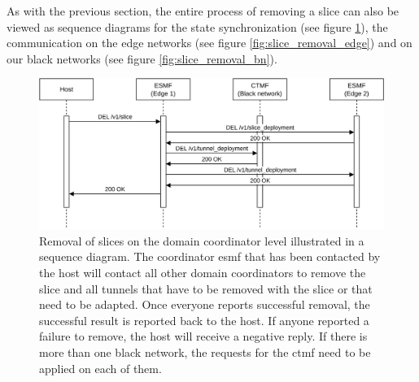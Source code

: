 As with the previous section, the entire process of removing a slice can also be viewed as sequence diagrams for the state synchronization (see figure \ref{fig:slice_removal_synchronization}), the communication on the edge networks (see figure \ref{fig:slice_removal_edge}) and on our black networks (see figure \ref{fig:slice_removal_bn}).

\begin{figure}[H]
  \centering
  \includegraphics[width=\linewidth]{images/chapter_6/slice_removal_coordination.png}
  \caption[Slice removal on the coordinators]{Removal of slices on the domain coordinator level illustrated in a sequence diagram. The coordinator \acrshort{esmf} that has been contacted by the host will contact all other domain coordinators to remove the slice and all tunnels that have to be removed with the slice or that need to be adapted. Once everyone reports successful removal, the successful result is reported back to the host. If anyone reported a failure to remove, the host will receive a negative reply. If there is more than one black network, the requests for the \acrshort{ctmf} need to be applied on each of them.}
  \label{fig:slice_removal_synchronization}
\end{figure}
